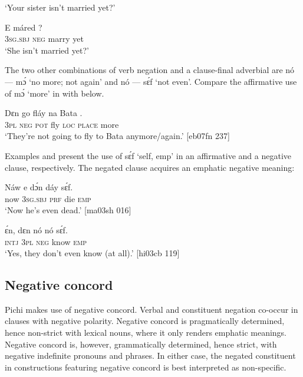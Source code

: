 \glt ‘Your sister isn’t married yet?’
\z


\ea%
    \label{ex:key:544}
    \gll E      máred  ?\\
\textsc{3sg.sbj}  \textsc{neg}  marry  yet\\

\glt ‘She isn’t married yet?’
\z

The two other combinations of verb negation and a clause-final adverbial are nó — mɔ́ ‘no more; not again’ and nó — sɛ́f ‘not even’. Compare the affirmative use of mɔ́ ‘more’ in  with  below. 


\ea%
    \label{ex:key:545}
    \gll Dɛn    go  fláy  na  Bata    .\\
\textsc{3pl}  \textsc{neg}  \textsc{pot}  fly  \textsc{loc}  \textsc{place}  more\\

\glt ‘They’re not going to fly to Bata anymore/again.’ [eb07fn 237]
\z

Examples  and  present the use of sɛ́f ‘self, emp’ in an affirmative and a negative clause, respectively. The negated clause acquires an emphatic negative meaning: 


\ea%
    \label{ex:key:546}
    \gll Náw    e    dɔ́n  dáy  sɛ́f.\\
now    \textsc{3sg.sbj}  \textsc{prf}  die  \textsc{emp}\\

\glt ‘Now he’s even dead.’ [ma03sh 016]
\z


\ea%
    \label{ex:key:547}
    \gll ɛ́n,  dɛn  nó  nó    sɛ́f.\\
\textsc{intj}  \textsc{3pl}  \textsc{neg}  know  \textsc{emp}\\

\glt ‘Yes, they don’t even know (at all).’ [hi03cb 119]
\z

\subsection{Negative concord}\label{sec:7.2.2}

Pichi makes use of negative concord. Verbal and constituent negation co-occur in clauses with negative polarity. Negative concord is pragmatically determined, hence non-strict with lexical nouns, where it only renders emphatic meanings. Negative concord is, however, grammatically determined, hence strict, with negative indefinite pronouns and phrases. In either case, the negated constituent in constructions featuring negative concord is best interpreted as non-specific. 



